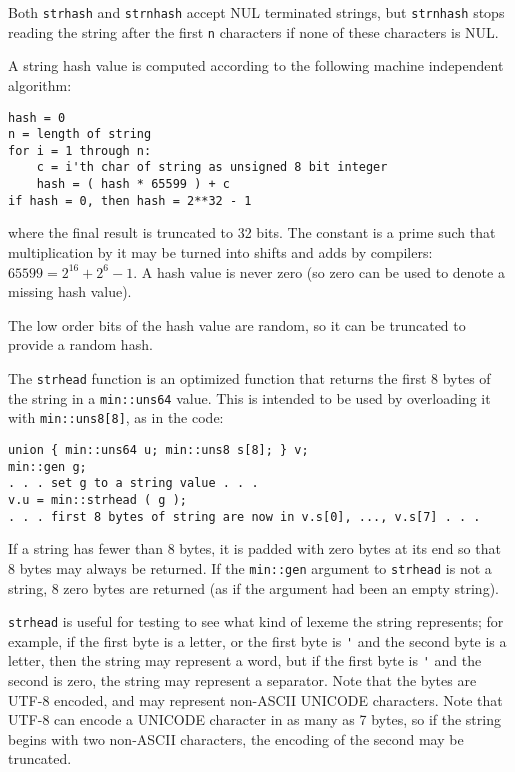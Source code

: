 \documentclass[12pt]{article}
\newenvironment{indpar}[1][0.3in]%
	{\begin{list}{}%
		     {\setlength{\itemsep}{0in}%
		      \setlength{\topsep}{0in}%
		      \setlength{\parsep}{1ex}%
		      \setlength{\labelwidth}{#1}%
		      \setlength{\leftmargin}{#1}%
		      \addtolength{\leftmargin}{\labelsep}}%
	 \item}%
	{\end{list}}
\begin{document}
Both \verb|strhash| and \verb|strnhash| accept NUL terminated strings, but
\verb|strnhash| stops reading the string after the first \verb|n| characters
if none of these characters is NUL.

A string hash value is computed according to the following machine
independent algorithm:\label{HASH-ALGORITHM}

\begin{indpar}\begin{verbatim}
hash = 0
n = length of string
for i = 1 through n:
    c = i'th char of string as unsigned 8 bit integer
    hash = ( hash * 65599 ) + c
if hash = 0, then hash = 2**32 - 1
\end{verbatim}\end{indpar}

where the final result is truncated to 32 bits.  The constant
is a prime such that multiplication by it may be turned into
shifts and adds by compilers: $65599=2^{16}+2^6-1$.
A hash value is never zero (so zero can be used to denote a missing hash value).

The low order bits of the hash value are random, so it can be
truncated to provide a random hash.

The \verb|strhead| function is an optimized function that
returns the first 8 bytes of the string
in a \verb|min::uns64| value.  This is intended to be used by
overloading it with \verb|min::uns8[8]|, as in the code:

\begin{indpar}\begin{verbatim}
union { min::uns64 u; min::uns8 s[8]; } v;
min::gen g;
. . . set g to a string value . . .
v.u = min::strhead ( g );
. . . first 8 bytes of string are now in v.s[0], ..., v.s[7] . . .
\end{verbatim}\end{indpar}

If a string has fewer than 8 bytes, it is padded with zero bytes
at its end so that 8 bytes may always be returned.  If the \verb|min::gen|
argument to \verb|strhead| is not a string, 8 zero bytes are returned
(as if the argument had been an empty string).

\verb|strhead| is useful for testing
to see what kind of lexeme the string represents; for
example, if the first byte is a letter, or the first byte is \verb|'|
and the second byte is a letter, then the string may represent a
word, but if the first byte is \verb|'| and the second is zero,
the string may represent a separator.
Note that the bytes are UTF-8 encoded, and may represent non-ASCII
UNICODE characters.  Note that UTF-8 can encode a UNICODE character
in as many as 7 bytes, so if the string begins with two non-ASCII
characters, the encoding of the second may be truncated.
\end{document}
